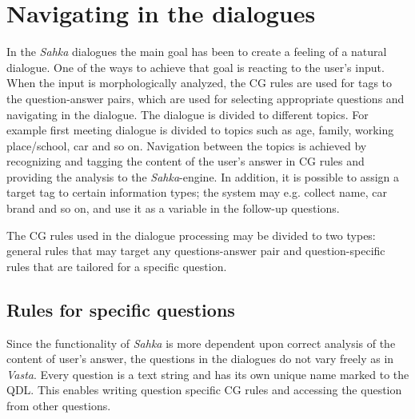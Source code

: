 \documentclass[11pt]{article}
\begin{document}
\section{Navigating in the dialogues}

In the \textit{Sahka} dialogues the main goal has been to create a feeling of a natural dialogue. One of the ways to achieve that goal is reacting to the user's input. When the input is morphologically analyzed, the CG rules are used for tags to the question-answer pairs, which are used for selecting appropriate questions and navigating in the dialogue. The dialogue is divided to different topics. For example first meeting dialogue is divided to topics such as age, family, working place/school, car and so on. Navigation between the topics is achieved by recognizing and tagging the content of the user's answer in CG rules and providing the analysis to the \textit{Sahka}-engine.  In addition, it is possible to assign a target tag to certain information types; the system may e.g. collect name, car brand and so on, and use it as a variable in the follow-up questions. 

The CG rules used in the dialogue processing may be divided to two types: general rules that may target any questions-answer pair and question-specific rules that are tailored for a specific question. %


\subsection{Rules for specific questions}
Since the functionality of \textit{Sahka} is more dependent upon correct analysis of the content of user's answer, the questions in the dialogues do not vary freely as in \textit{Vasta}. Every question is a text string and has its own unique name marked to the QDL.  This enables writing question specific CG rules and accessing the question from other questions. \\ 
\end{document}
